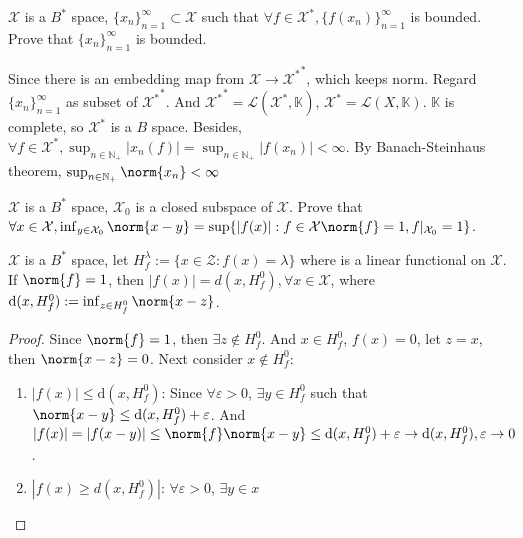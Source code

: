 \documentclass{ctexart}
\begin{document}
\begin{problem}
\(\mathcal{X}\) is a \(B^*\) space, \(\{x_n\}_{n=1}^{\infty} \subset \mathcal{X}\) such that \(\forall f \in \mathcal{X}^*, \{f(x_n)\}_{n=1}^{\infty}\) is bounded.
Prove that \(\{x_n\}_{n=1}^{\infty}\) is bounded.
\end{problem}
\begin{solution}
  Since there is an embedding map from \(\mathcal{X} \to {\mathcal{X}^*}^*\), which keeps norm. Regard \(\{x_n\}_{n=1}^{\infty}\) as subset of \({\mathcal{X}^*}^*\).
  And \({\mathcal{X}^*}^*= \mathcal{L}(\mathcal{X}^*, \mathbb{K})\), \(\mathcal{X}^*=\mathcal{L}(X, \mathbb{K})\). 
  \(\mathbb{K}\) is complete, so \(\mathcal{X}^*\) is a \(B\) space.
  Besides, \(\forall f \in \mathcal{X}^*, \sup_{n \in \mathbb{N}_+} |x_n(f)|=\sup_{n \in \mathbb{N}_+} |f(x_n)|<\infty\).
  By Banach-Steinhaus theorem, \(\sup_{n \in \mathbb{N}_+}\norm{x_n}<\infty \)
\end{solution}
\begin{problem}
\(\mathcal{X}\) is a \(B^*\) space, \(\mathcal{X}_0\) is a closed subspace of \(\mathcal{X}\).
Prove that \(\forall x \in \mathcal{X}, \inf_{y \in \mathcal{X}_0}\norm{x-y}=\sup\{|f(x)|:f \in \mathcal{X} \norm{f}=1, f|_{\mathcal{X}_0}=1\} \).

\end{problem}
\begin{lemma}\label{lem:1}
  \(\mathcal{X}\) is a \(B^*\) space, let \(H_{f}^{\lambda}:=\{x \in \mathcal{Z}: f(x)=\lambda\}\) where is a linear functional on \(\mathcal{X}\). 
  If \(\norm{f}=1\), then \(|f(x)| =  d(x, H_f^0), \forall x \in \mathcal{X}\), where \(\mathrm{d}(x, H_f^0):=\inf_{z \in H_f^0}\norm{x-z}\). 

\end{lemma}
\begin{proof}
  Since \(\norm{f}=1\), then \(\exists z \notin H_f^0\). And \(x \in H_f^0\), \(f(x)=0\), let \(z=x\), then \(\norm{x-z}=0\). Next consider \(x \notin H_f^0\):
  \begin{enumerate} 
    \item \(|f(x)| \leq \mathrm{d}(x, H_f^0)\): Since \(\forall \varepsilon >0\), \(\exists y \in H_f^0\)
      such that \(\norm{x-y} \leq \mathrm{d}(x, H_f^0)+ \varepsilon \). And \(|f(x)|=|f(x-y)| \leq \norm{f}\norm{x-y} \leq \mathrm{d}(x,H_f^0)+ \varepsilon \to \mathrm{d}(x,H_f^0), \varepsilon \to 0\).
    \item \(|f(x) \geq d(x, H_f^0)|\): \(\forall \varepsilon > 0 \), \(\exists y \in x\) 


  \end{enumerate}
\end{proof}
\end{document}
